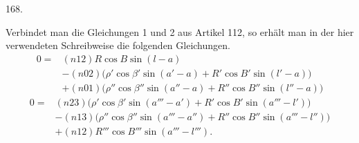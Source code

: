 \par{}\medskip
\begin{center}\hypertarget{native-231-article168}{}168.\end{center}
Verbindet man die Gleichungen 1 und 2 aus Artikel 112, so erhält man in der hier verwendeten Schreibweise die folgenden Gleichungen.
\[
\begin{aligned}
0={}&(n12)R\cos B\sin(l-a)\\
&-(n02)\bigl(\rho'\cos\beta'\sin(a'-a)+R'\cos B'\sin(l'-a)\bigr)\\
&+(n01)\bigl(\rho''\cos\beta''\sin(a''-a)+R''\cos B''\sin(l''-a)\bigr)
\end{aligned}
\]
\[
\begin{aligned}
0={}&(n23)\bigl(\rho'\cos\beta'\sin(a'''-a')+R'\cos B'\sin(a'''-l')\bigr)\\
&-(n13)\bigl(\rho''\cos\beta''\sin(a'''-a'')+R''\cos B''\sin(a'''-l'')\bigr)\\
&+(n12)R'''\cos B'''\sin(a'''-l''').
\end{aligned}
\]

